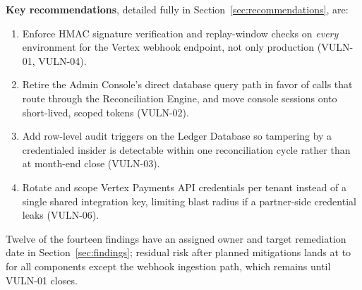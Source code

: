 \textbf{Key recommendations}, detailed fully in Section~\ref{sec:recommendations}, are:

\begin{enumerate}[leftmargin=1.4em]
  \item Enforce HMAC signature verification and replay-window checks on \emph{every} environment for the Vertex webhook endpoint, not only production (VULN-01, VULN-04).
  \item Retire the Admin Console's direct database query path in favor of calls that route through the Reconciliation Engine, and move console sessions onto short-lived, scoped tokens (VULN-02).
  \item Add row-level audit triggers on the Ledger Database so tampering by a credentialed insider is detectable within one reconciliation cycle rather than at month-end close (VULN-03).
  \item Rotate and scope Vertex Payments API credentials per tenant instead of a single shared integration key, limiting blast radius if a partner-side credential leaks (VULN-06).
\end{enumerate}

Twelve of the fourteen findings have an assigned owner and target remediation date in Section~\ref{sec:findings}; residual risk after planned mitigations lands at \lowrisk{} to \mediumrisk{} for all components except the webhook ingestion path, which remains \highrisk{} until VULN-01 closes.
